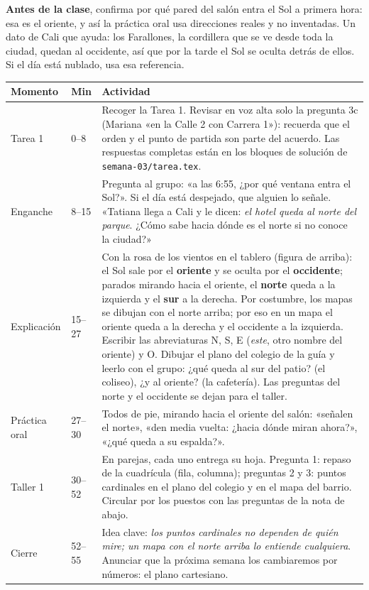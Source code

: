 \documentclass[11pt]{article}
\begin{document}
\begin{nota}
\textbf{Antes de la clase}, confirma por qué pared del salón entra el Sol a primera hora: esa
es el oriente, y así la práctica oral usa direcciones reales y no inventadas. Un dato de Cali
que ayuda: los Farallones, la cordillera que se ve desde toda la ciudad, quedan al occidente,
así que por la tarde el Sol se oculta detrás de ellos. Si el día está nublado, usa esa
referencia.
\end{nota}

\begin{center}
{\renewcommand{\arraystretch}{1.3}
\begin{tabularx}{\linewidth}{@{}l l X@{}}
  \toprule
  \textbf{Momento} & \textbf{Min} & \textbf{Actividad}\\
  \midrule
  Tarea 1 & 0--8 & Recoger la Tarea 1. Revisar en voz alta solo la pregunta 3c (Mariana
    «en la Calle 2 con Carrera 1»): recuerda que el orden y el punto de partida son parte del
    acuerdo. Las respuestas completas están en los bloques de solución de \texttt{semana-03/tarea.tex}.\\
  Enganche & 8--15 & Pregunta al grupo: «a las 6:55, ¿por qué ventana entra el Sol?». Si el
    día está despejado, que alguien lo señale. «Tatiana llega a Cali y le dicen: \emph{el
    hotel queda al norte del parque}. ¿Cómo sabe hacia dónde es el norte si no conoce la
    ciudad?»\\
  Explicación & 15--27 & Con la rosa de los vientos en el tablero (figura de arriba): el Sol sale
    por el \textbf{oriente} y se oculta por el \textbf{occidente}; parados mirando hacia el
    oriente, el \textbf{norte} queda a la izquierda y el \textbf{sur} a la derecha. Por
    costumbre, los mapas se dibujan con el norte arriba; por eso en un mapa el oriente queda a
    la derecha y el occidente a la izquierda. Escribir las abreviaturas N, S, E (\emph{este},
    otro nombre del oriente) y O. Dibujar el plano del colegio de la guía y leerlo con el
    grupo: ¿qué queda al sur del patio? (el coliseo), ¿y al oriente? (la cafetería). Las
    preguntas del norte y el occidente se dejan para el taller.\\
  Práctica oral & 27--30 & Todos de pie, mirando hacia el oriente del salón: «señalen el
    norte», «den media vuelta: ¿hacia dónde miran ahora?», «¿qué queda a su espalda?».\\
  Taller 1 & 30--52 & En parejas, cada uno entrega su hoja. Pregunta 1: repaso de la
    cuadrícula (fila, columna); preguntas 2 y 3: puntos cardinales en el plano del colegio y
    en el mapa del barrio. Circular por los puestos con las preguntas de la nota de abajo.\\
  Cierre & 52--55 & Idea clave: \emph{los puntos cardinales no dependen de quién mire; un mapa
    con el norte arriba lo entiende cualquiera}. Anunciar que la próxima semana los cambiaremos
    por números: el plano cartesiano.\\
  \bottomrule
\end{tabularx}}
\end{center}
\end{document}
